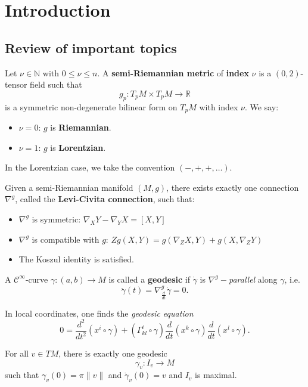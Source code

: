 \chapter{Introduction}
\setcounter{section}{-1}
\section{Review of important topics}
\begin{definition}
   Let $\nu \in \mathbb{N}$ with $0 \leq \nu \leq n$. A \textbf{semi-Riemannian metric} of \textbf{index} $\nu$ is a $(0,2)$-tensor field such that \[
   g_p: T_pM \times T_pM \to \mathbb{R}
   \] is a symmetric non-degenerate bilinear form on $T_pM$ with index $\nu$. We say:
   \begin{itemize}
       \item $\nu = 0$: $g$ is \textbf{Riemannian}.
        \item $\nu =1$: $g$ is \textbf{Lorentzian}.
   \end{itemize}
\end{definition}
In the Lorentzian case, we take the convention $(-,+,+,\dots)$.
\begin{theorem}
   Given a semi-Riemannian manifold $(M,g)$, there exists exactly one connection $\nabla^g$, called the \textbf{Levi-Civita connection}, such that:
   \begin{itemize}
       \item $\nabla^g$ is symmetric: $\nabla_X Y - \nabla_Y X = [X,Y]$
       \item $\nabla^g$ is compatible with $g$: $Zg(X,Y)= g(\nabla_Z X, Y) + g(X, \nabla_Z Y)$
        \item The Koszul identity is satisfied.
   \end{itemize}
\end{theorem}
\begin{definition}[Geodesic]
    A $\mathcal{C}^\infty$-curve $\gamma: (a,b) \to M$ is called a \textbf{geodesic} if $\dot{\gamma}$ is $\nabla^g-$\emph{parallel} along $\gamma$, i.e. \[
        \ddot{\gamma}(t)= \nabla^g_{\frac{d}{dt}} \dot{\gamma}=0
    .\]
\end{definition}
In local coordinates, one finds the \emph{geodesic equation}
\[
    0 = \frac{d^2}{dt^2} (x^i \circ \gamma) + (\Gamma_{kl}^i \circ \gamma) \frac{d}{dt}(x^k \circ \gamma) \frac{d}{dt} (x^l \circ \gamma)
.\] 
\begin{theorem}
    For all $v \in TM$, there is exactly one geodesic \[
    \gamma_v: I_v \to M
\] such that $\gamma_v(0)=\pi \|v\|$ and $\dot{\gamma}_v (0)=v$ and $I_v$ is maximal.
\end{theorem}
